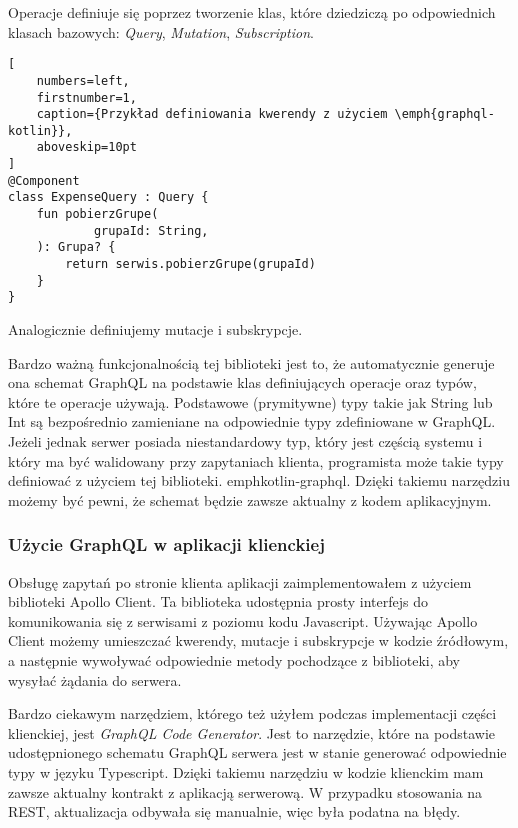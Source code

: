 Operacje definiuje się poprzez tworzenie klas, które dziedziczą po odpowiednich klasach bazowych: \emph{Query}, \emph{Mutation}, \emph{Subscription}.

\begin{addmargin}[6mm]{0mm}
\begin{lstlisting}[
    numbers=left,
    firstnumber=1,
    caption={Przykład definiowania kwerendy z użyciem \emph{graphql-kotlin}},
    aboveskip=10pt
]
@Component
class ExpenseQuery : Query {
    fun pobierzGrupe(
            grupaId: String,
    ): Grupa? {
        return serwis.pobierzGrupe(grupaId)
    }
}
\end{lstlisting}
\end{addmargin}

Analogicznie definiujemy mutacje i subskrypcje.

Bardzo ważną funkcjonalnością tej biblioteki jest to, że automatycznie generuje ona schemat GraphQL na podstawie klas definiujących operacje oraz typów, które te operacje używają. Podstawowe (prymitywne) typy takie jak String lub Int są bezpośrednio zamieniane na odpowiednie typy zdefiniowane w GraphQL. Jeżeli jednak serwer posiada niestandardowy typ, który jest częścią systemu i który ma być walidowany przy zapytaniach klienta, programista może takie typy definiować z użyciem tej biblioteki. emph{kotlin-graphql}.
Dzięki takiemu narzędziu możemy być pewni, że schemat będzie zawsze aktualny z kodem aplikacyjnym.


\subsubsection{Użycie GraphQL w aplikacji klienckiej}
Obsługę zapytań po stronie klienta aplikacji zaimplementowałem z użyciem biblioteki Apollo Client. Ta biblioteka udostępnia prosty interfejs do komunikowania się z serwisami z poziomu kodu Javascript. Używając Apollo Client możemy umieszczać kwerendy, mutacje i subskrypcje w kodzie źródłowym, a następnie wywoływać odpowiednie metody pochodzące z biblioteki, aby wysyłać żądania do serwera.

Bardzo ciekawym narzędziem, którego też użyłem podczas implementacji części klienckiej, jest \emph{GraphQL Code Generator}. Jest to narzędzie, które na podstawie udostępnionego schematu GraphQL serwera jest w stanie generować odpowiednie typy w języku Typescript. Dzięki takiemu narzędziu w kodzie klienckim mam zawsze aktualny kontrakt z aplikacją serwerową. W przypadku stosowania na REST, aktualizacja odbywała się manualnie, więc była podatna na błędy.

